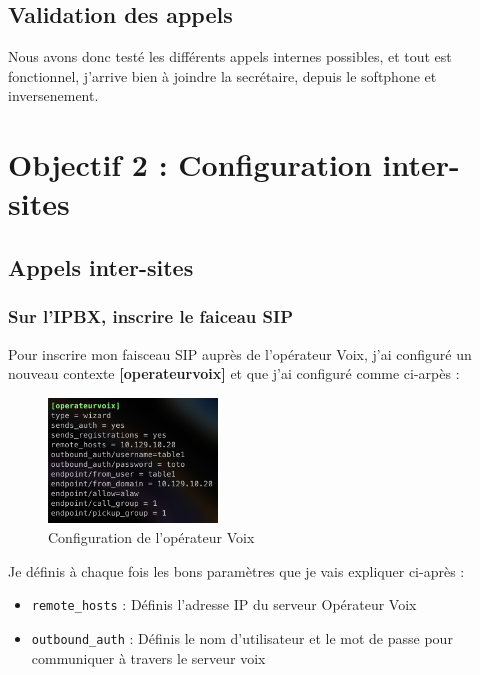 \documentclass[12pt, a4paper]{article}
\begin{document}
\subsection{Validation des appels}
Nous avons donc testé les différents appels internes possibles, et tout 
est fonctionnel, j'arrive bien à joindre la secrétaire, depuis le 
softphone et inversenement. 

\newpage
\section{Objectif 2 : Configuration inter-sites}
	\subsection{Appels inter-sites}
	\subsubsection{Sur l'IPBX, inscrire le faiceau SIP}
	Pour inscrire mon faisceau SIP auprès de l'opérateur Voix, j'ai 
	configuré un nouveau contexte \textbf{[operateurvoix]} et que j'ai configuré
	comme ci-arpès : 

	\begin{figure}[h]
		\centering
		\includegraphics[width=0.4\textwidth]{img/inter.png}
		\caption{Configuration de l'opérateur Voix}
		\label{fig:opvoix}
	\end{figure}
	Je définis à chaque fois les bons paramètres que je vais expliquer ci-après :
	\begin{itemize}
		\item \texttt{remote\_hosts} : Définis l'adresse IP du serveur Opérateur Voix
		\item \texttt{outbound\_auth} : Définis le nom d'utilisateur et le mot de passe pour communiquer à travers le serveur voix
	\end{itemize}
\end{document}
